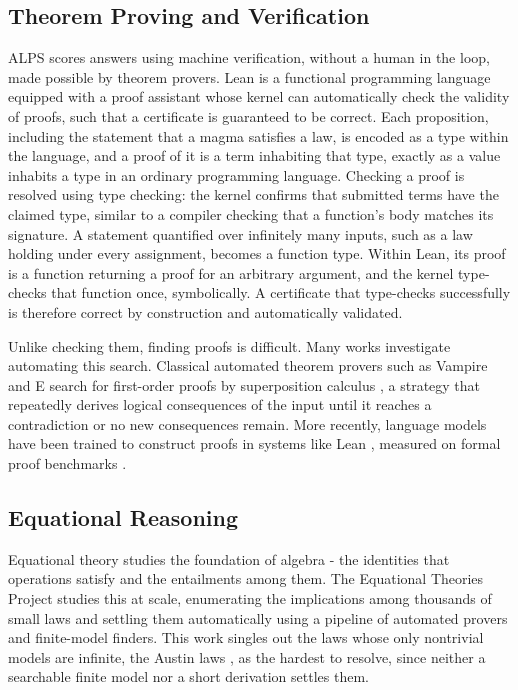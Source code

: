 \documentclass[letterpaper]{article} %
\begin{document}
\subsection{Theorem Proving and Verification}
ALPS scores answers using machine verification, without a human in the loop, made possible by theorem provers. Lean \citep{moura2021lean} is a functional programming language equipped with a proof assistant whose kernel can automatically check the validity of proofs, such that a certificate is guaranteed to be correct. Each proposition, including the statement that a magma satisfies a law, is encoded as a type within the language, and a proof of it is a term inhabiting that type, exactly as a value inhabits a type in an ordinary programming language. Checking a proof is resolved using type checking: the kernel confirms that submitted terms have the claimed type, similar to a compiler checking that a function's body matches its signature. A statement quantified over infinitely many inputs, such as a law holding under every assignment, becomes a function type. Within Lean, its proof is a function returning a proof for an arbitrary argument, and the kernel type-checks that function once, symbolically. A certificate that type-checks successfully is therefore correct by construction and automatically validated. 

Unlike checking them, finding proofs is difficult. Many works investigate automating this search. Classical automated theorem provers such as Vampire and E \citep{kovacs2013first, schulz2019faster} search for first-order proofs by superposition calculus \citep{bachmair1994rewrite}, a strategy that repeatedly derives logical consequences of the input until it reaches a contradiction or no new consequences remain. More recently, language models have been trained to construct proofs in systems like Lean \citep{yang2023leandojo, xin2024deepseek, hubert2026olympiad}, measured on formal proof benchmarks \citep{zheng2021minif2f}. 




\subsection{Equational Reasoning}
Equational theory studies the foundation of algebra - the identities that operations satisfy and the entailments among them. The Equational Theories Project \citep{bolan2025equational} studies this at scale, enumerating the implications among thousands of small laws and settling them automatically using a pipeline of automated provers and finite-model finders. This work singles out the laws whose only nontrivial models are infinite, the Austin laws \citep{kisielewicz1997austin}, as the hardest to resolve, since neither a searchable finite model nor a short derivation settles them. 
\end{document}
